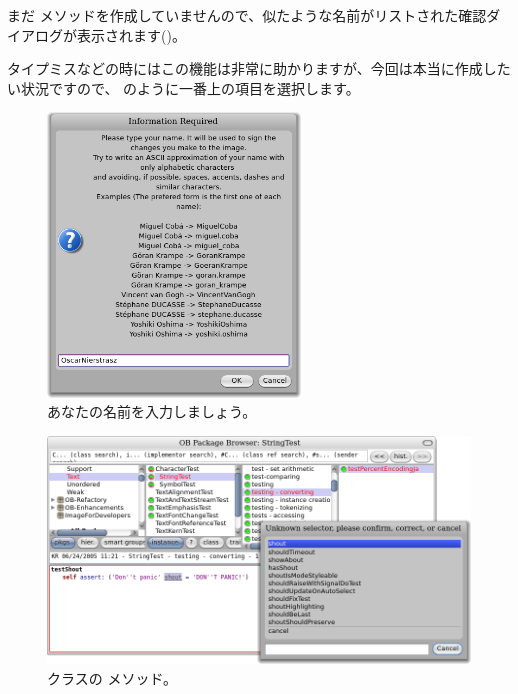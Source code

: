 \documentclass[a4paper,10pt,twoside]{book}
\begin{document}
まだ  メソッドを作成していませんので、似たような名前がリストされた確認ダイアログが表示されます()。

タイプミスなどの時にはこの機能は非常に助かりますが、今回は本当に作成したい状況ですので、 のように一番上の項目を選択します。


\begin{figure}[htb]
\centerline {\includegraphics[width=0.6\textwidth]{name}}
\caption{あなたの名前を入力しましょう。}
\end{figure}

\begin{figure}[htb]
\centerline {\includegraphics[width=\textwidth]{testShoutConfirm}}
\caption{ クラスの  メソッド。}
\end{figure}
\end{document}
